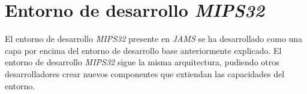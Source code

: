 \chapter{Entorno de desarrollo \textit{MIPS32}}\label{ch:entorno-de-desarrollo-mips32}

El entorno de desarrollo \textit{MIPS32} presente
en \textit{JAMS} se ha desarrollado como una
capa por encima del entorno de desarrollo base
anteriormente explicado.
El entorno de desarrollo \textit{MIPS32} sigue
la misma arquitectura, pudiendo otros desarrolladores
crear nuevos componentes que extiendan las capacidades
del entorno.